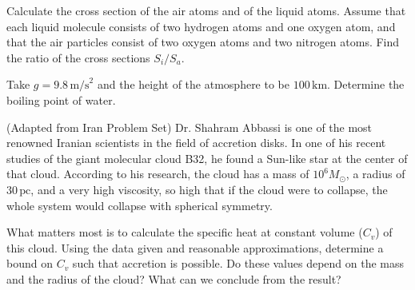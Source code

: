 \documentclass[11pt]{article}
\begin{document}
\begin{pproblem}
\begin{alternativas}
\item Calculate the cross section of the air atoms and of the liquid atoms. Assume that each liquid molecule consists of two hydrogen atoms and one oxygen atom, and that the air particles consist of two oxygen atoms and two nitrogen atoms. Find the ratio of the cross sections $S_i/S_a$.

\item Take $g = 9.8 \, \text{m/s}^2$ and the height of the atmosphere to be $100 \, \text{km}$. Determine the boiling point of water.

\end{alternativas}

\end{pproblem}

\begin{pproblem} (Adapted from Iran Problem Set)
    Dr. Shahram Abbassi is one of the most renowned Iranian scientists in the field of accretion disks. In one of his recent studies of the giant molecular cloud B32, he found a Sun-like star at the center of that cloud. According to his research, the cloud has a mass of $10^6 M_\odot$, a radius of $30 \, \text{pc}$, and a very high viscosity, so high that if the cloud were to collapse, the whole system would collapse with spherical symmetry.

    What matters most is to calculate the specific heat at constant volume ($C_v$) of this cloud. Using the data given and reasonable approximations, determine a bound on $C_v$ such that accretion is possible. Do these values depend on the mass and the radius of the cloud? What can we conclude from the result?

\end{pproblem}
\end{document}
